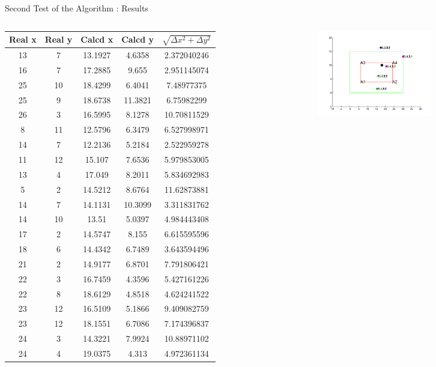\documentclass[utf8,compress]{beamer}
\begin{document}
\begin{frame}[containsverbatim]{Second Test of the Algorithm : Results }
\begin{columns}
\begin{column}{0.5\textwidth}\tiny

\begin{tabular}{|c|c|c|c|c|}
\hline
	\textbf Real x & \textbf Real y & \textbf Calcd x & \textbf Calcd y & $\sqrt{\Delta x^2 + \Delta y^2} $ \\
\hline
\hline
13&	7&	13.1927&	4.6358&	2.372040246\\
16&	7&	17.2885&	9.655&	2.951145074\\
25&	10&	18.4299&	6.4041&	7.48977375\\
25&	9&	18.6738&	11.3821&	6.75982299\\
26&	3&	16.5995&	8.1278&	10.70811529\\
8&	11&	12.5796&	6.3479&	6.527998971\\
14&	7&	12.2136&	5.2184&	2.522959278\\
11&	12&	15.107&	7.6536&	5.979853005\\
13&	4&	17.049&	8.2011&	5.834692983\\
5&	2&	14.5212&	8.6764&	11.62873881\\
14&	7&	14.1131&	10.3099&	3.311831762\\
14&	10&	13.51&		5.0397&	4.984443408\\
17&	2&	14.5747&	8.155&	6.615595596\\
18&	6&	14.4342&	6.7489&	3.643594496\\
21&	2&	14.9177&	6.8701&	7.791806421\\
22&	3&	16.7459&	4.3596&	5.427161226\\
22&	8&	18.6129&	4.8518&	4.624241522\\
23&	12&	16.5109&	5.1866&	9.409082759\\
23&	12&	18.1551&	6.7086&	7.174396837\\
24&	3&	14.3221&	7.9924&	10.88971102\\
24&	4&	19.0375&	4.313&	4.972361134\\

\hline
\end{tabular}
\end{column}
\begin{column}{0.5\textwidth}
    \begin{figure}[h]
        \includegraphics[width=5cm]{t2cc.png}
    \end{figure}
\end{column}

\end{columns}

\end{frame}
\end{document}
